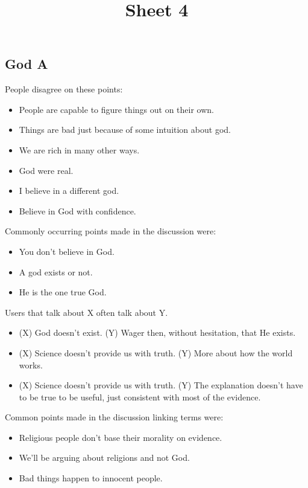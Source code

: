 \documentclass[tikz]{article}
\title{\textbf{Sheet 4}\vspace{-9ex}}
\date{}
\begin{document}
  \maketitle

  \begin{multicols}{2}
    \subsection*{God A}
    People disagree on these points:
    \begin{itemize}[noitemsep,nolistsep,label={}]
		\item{People are capable to figure things out on their own.}
		\item{Things are bad just because of some intuition about god.}
		\item{We are rich in many other ways.}
		\item{God were real.}
		\item{I believe in a different god.}
		\item{Believe in God with confidence.}
    \end{itemize}

    Commonly occurring points made in the discussion were:
    \begin{itemize}[noitemsep,nolistsep,label={}]
		\item{You don't believe in God.}
		\item{A god exists or not.}
		\item{He is the one true God.}
    \end{itemize}

    Users that talk about X often talk about Y.
    \begin{itemize}[noitemsep,nolistsep,label={}]
		\item{(X) God doesn't exist. (Y) Wager then, without hesitation, that He exists.}
		\item{(X) Science doesn't provide us with truth. (Y) More about how the world works.}
		\item{(X) Science doesn't provide us with truth. (Y) The explanation doesn't have to be true to be useful, just consistent with most of the evidence.}
    \end{itemize}

    Common points made in the discussion linking terms were:
    \begin{itemize}[noitemsep,nolistsep,label={}]
		\item{Religious people don't base their morality on evidence.}
		\item{We'll be arguing about religions and not God.}
		\item{Bad things happen to innocent people.}
    \end{itemize}


\end{multicols}
\end{document}
